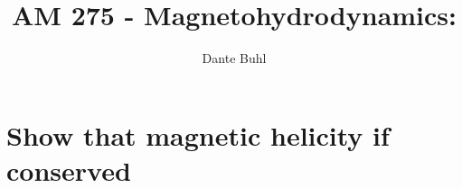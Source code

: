 \documentclass{article}
\begin{document}
\title{AM 275 - Magnetohydrodynamics:}
\author{Dante Buhl}


\newcommand{\wrms}{w_{\text{rms}}}
\newcommand{\bs}[1]{\boldsymbol{#1}}
\newcommand{\tb}[1]{\textbf{#1}}
\newcommand{\bmp}[1]{\begin{minipage}{#1\textwidth}}
\newcommand{\emp}{\end{minipage}}
\newcommand{\R}{\mathbb{R}}
\newcommand{\C}{\mathbb{C}}
\newcommand{\N}{\mathcal{N}}
\newcommand{\K}{\bs{\mathrm{K}}}
\newcommand{\m}{\bs{\mu}_*}
\newcommand{\s}{\bs{\Sigma}_*}
\newcommand{\dt}{\Delta t}
\newcommand{\dx}{\Delta x}
\newcommand{\tr}[1]{\text{Tr}(#1)}
\newcommand{\Tr}[1]{\text{Tr}(#1)}
\newcommand{\Div}{\nabla \cdot}
\renewcommand{\div}{\nabla \cdot}
\newcommand{\Curl}{\nabla \times}
\newcommand{\Grad}{\nabla}
\newcommand{\grad}{\nabla}
\newcommand{\grads}{\nabla_s}
\newcommand{\gradf}{\nabla_f}
\newcommand{\xs}{x_s}
\newcommand{\xf}{x_f}
\newcommand{\ts}{t_s}
\newcommand{\tf}{t_f}
\newcommand{\pt}{\partial t}
\newcommand{\pz}{\partial z}
\newcommand{\uvec}{\bs{u}}
\newcommand{\bvec}{\bs{B}}
\newcommand{\nvec}{\hat{\bs{n}}}
\newcommand{\B}{\bs{B}}
\newcommand{\A}{\bs{A}}
\newcommand{\jvec}{\bs{j}}
\newcommand{\F}{\bs{F}}
\newcommand{\T}{\tilde{T}}
\newcommand{\ez}{\bs{e}_z}
\newcommand{\ex}{\bs{e}_x}
\newcommand{\ey}{\bs{e}_y}
\newcommand{\eo}{\bs{e}_{\bs{\Omega}}}
\newcommand{\ppt}[1]{\frac{\partial #1}{\partial t}}
\newcommand{\pp}[2]{\frac{\partial #1}{\partial #2}}
\newcommand{\pptwo}[2]{\frac{\partial^2 #1}{\partial #2^2}}
\newcommand{\DDt}[1]{\frac{D #1}{D t}}
\newcommand{\ppts}[1]{\frac{\partial #1}{\partial t_s}}
\newcommand{\pptf}[1]{\frac{\partial #1}{\partial t_f}}
\newcommand{\ppz}[1]{\frac{\partial #1}{\partial z}}
\newcommand{\ddz}[1]{\frac{d #1}{d z}}
\newcommand{\ppzetas}[1]{\frac{\partial^2 #1}{\partial \zeta^2}}
\newcommand{\ppzs}[1]{\frac{\partial #1}{\partial z_s}}
\newcommand{\ppzf}[1]{\frac{\partial #1}{\partial z_f}}
\newcommand{\ppx}[1]{\frac{\partial #1}{\partial x}}
\newcommand{\ppxi}[1]{\frac{\partial #1}{\partial x_i}}
\newcommand{\ppxj}[1]{\frac{\partial #1}{\partial x_j}}
\newcommand{\ppy}[1]{\frac{\partial #1}{\partial y}}
\newcommand{\ppzeta}[1]{\frac{\partial #1}{\partial \zeta}}


\maketitle 
\setlength{\parindent}{0pt}

\section{Show that magnetic helicity if conserved}
\end{document}
